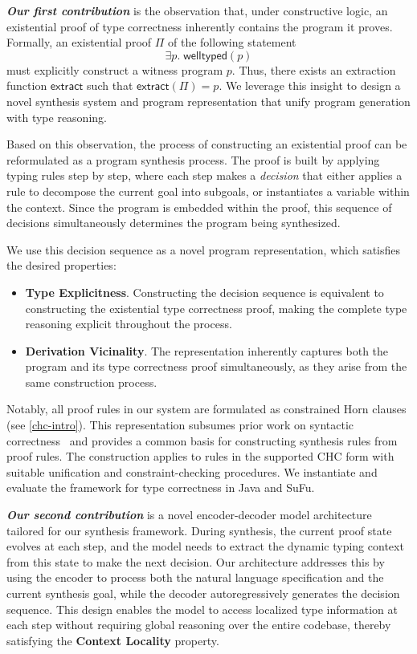 \textbf{\textit{Our first contribution}} is the observation that, under constructive logic, an existential proof of type correctness inherently contains the program it proves. Formally, an existential proof $\Pi$ of the following statement
\[
\exists p.\; \mathsf{welltyped}(p)
\]
must explicitly construct a witness program $p$. Thus, there exists an extraction function $\mathsf{extract}$ such that $\mathsf{extract}(\Pi) = p$. We leverage this insight to design a novel synthesis system and program representation that unify program generation with type reasoning.

Based on this observation, the process of constructing an existential proof can be reformulated as a program synthesis process. The proof is built by applying typing rules step by step, where each step makes a \textit{decision} that either applies a rule to decompose the current goal into subgoals, or instantiates a variable within the context. Since the program is embedded within the proof, this sequence of decisions simultaneously determines the program being synthesized.

We use this decision sequence as a novel program representation, which satisfies the desired properties:
\begin{itemize}
    \item \textbf{Type Explicitness}. Constructing the decision sequence is equivalent to constructing the existential type correctness proof, making the complete type reasoning explicit throughout the process.
    \item \textbf{Derivation Vicinality}. The representation inherently captures both the program and its type correctness proof simultaneously, as they arise from the same construction process.
\end{itemize}

Notably, all proof rules in our system are formulated as constrained Horn clauses (see \autoref{chc-intro}). This representation subsumes prior work on syntactic correctness~\cite{DBLP:conf/icse/ZhuL000C24,DBLP:conf/acl/LiangZ0LLXCZZZC25} and provides a common basis for constructing synthesis rules from proof rules. The construction applies to rules in the supported CHC form with suitable unification and constraint-checking procedures. We instantiate and evaluate the framework for type correctness in Java and SuFu.

\textbf{\textit{Our second contribution}} is a novel encoder-decoder model architecture tailored for our synthesis framework. During synthesis, the current proof state evolves at each step, and the model needs to extract the dynamic typing context from this state to make the next decision. Our architecture addresses this by using the encoder to process both the natural language specification and the current synthesis goal, while the decoder autoregressively generates the decision sequence. This design enables the model to access localized type information at each step without requiring global reasoning over the entire codebase, thereby satisfying the \textbf{Context Locality} property.

